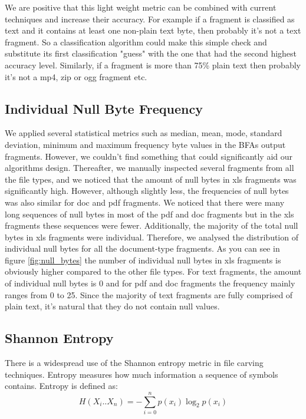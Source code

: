 We are positive that this light weight metric can be combined with current techniques and increase their accuracy. For example if a fragment is classified as text and it contains at least one non-plain text byte, then probably it's not a text fragment. So a classification algorithm could make this simple check and substitute its first classification "guess" with the one that had the second highest accuracy level. Similarly, if a fragment is more than 75\% plain text then probably it's not a mp4, zip or ogg fragment etc.

\subsection{Individual Null Byte Frequency}
We applied several statistical metrics such as median, mean, mode, standard deviation, minimum and maximum frequency byte values in the BFAs output fragments. However, we couldn't find something that could significantly aid our algorithms design. Thereafter, we manually inspected several fragments from all the file types, and we noticed that the amount of null bytes in xls fragments was significantly high. However, although slightly less, the frequencies of null bytes was also similar for doc and pdf fragments. We noticed that there were many long sequences of null bytes in most of the pdf and doc fragments but in the xls fragments these sequences were fewer. Additionally, the majority of the total null bytes in xls fragments were individual. Therefore, we analysed the distribution of individual null bytes for all the document-type fragments. As you can see in figure \ref{fig:null_bytes} the number of individual null bytes in xls fragments is obviously higher compared to the other file types. For text fragments, the amount of individual null bytes is 0 and for pdf and doc fragments the frequency mainly ranges from 0 to 25. Since the majority of text fragments are fully comprised of plain text, it's natural that they do not contain null values.





\subsection{Shannon Entropy}
There is a widespread use of the Shannon entropy\cite{Shannon} metric in file carving techniques. Entropy measures how much information a sequence of symbols contains. Entropy is defined as:
 \begin{displaymath}
 H({X_i}..{X_n})=-\sum_{i=0}^{n}{p({x_i})}\log_2{p({x_i})}
\end{displaymath} 

